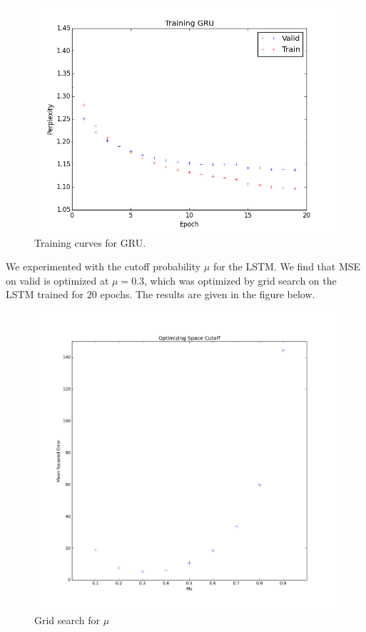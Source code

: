 \documentclass[11pt]{article}
\begin{document}
\begin{figure}[H]
\centering
\includegraphics[scale=0.5]{train_gru}
\caption{Training curves for GRU.}
\end{figure}

We experimented with the cutoff probability $\mu$ for the LSTM. We find that MSE on valid is optimized at $\mu = 0.3$, which was optimized by grid search on the LSTM trained for $20$ epochs. The results are given in the figure below.  %

\begin{figure}[H]
\centering
\includegraphics[scale=0.4]{mu_plot}
\caption{Grid search for $\mu$}
\end{figure}
\end{document}
